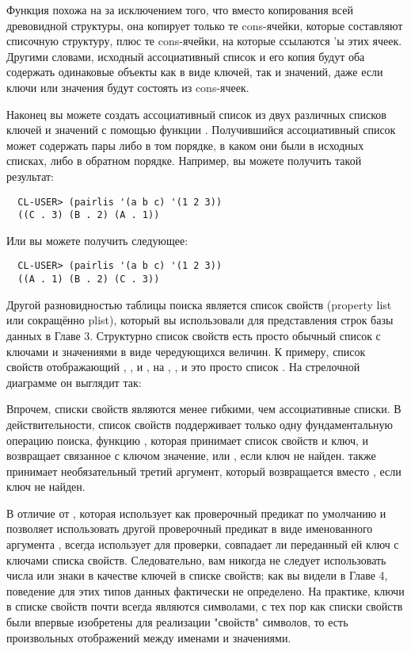 Функция  похожа на  за исключением того, что вместо
копирования всей древовидной структуры, она копирует только те cons-ячейки, которые
составляют списочную структуру, плюс те cons-ячейки, на которые ссылаются 'ы
этих ячеек. Другими словами, исходный ассоциативный список и его копия будут оба содержать
одинаковые объекты как в виде ключей, так и значений, даже если ключи или значения будут
состоять из cons-ячеек.

Наконец вы можете создать ассоциативный список из двух различных списков ключей и значений
с помощью функции . Получившийся ассоциативный список может содержать пары
либо в том порядке, в каком они были в исходных списках, либо в обратном
порядке. Например, вы можете получить такой результат:

\begin{verbatim}
  CL-USER> (pairlis '(a b c) '(1 2 3))
  ((C . 3) (B . 2) (A . 1))
\end{verbatim}

Или вы можете получить следующее:

\begin{verbatim}
  CL-USER> (pairlis '(a b c) '(1 2 3))
  ((A . 1) (B . 2) (C . 3))
\end{verbatim}

Другой разновидностью таблицы поиска является список свойств (property list или сокращённо
plist), который вы использовали для представления строк базы данных в Главе 3. Структурно
список свойств есть просто обычный список с ключами и значениями в виде чередующихся
величин. К примеру, список свойств отображающий , , и , на
, , и  это просто список . На стрелочной
диаграмме он выглядит так:


Впрочем, списки свойств являются менее гибкими, чем ассоциативные списки. В
действительности, список свойств поддерживает только одну фундаментальную операцию поиска,
функцию , которая принимает список свойств и ключ, и возвращает связанное с
ключом значение, или , если ключ не найден.  также принимает
необязательный третий аргумент, который возвращается вместо , если ключ не
найден.

В отличие от , которая использует  как проверочный предикат по
умолчанию и позволяет использовать другой проверочный предикат в виде именованного
аргумента ,  всегда использует  для проверки, совпадает ли
переданный ей ключ с ключами списка свойств. Следовательно, вам никогда не следует
использовать числа или знаки в качестве ключей в списке свойств; как вы видели в Главе 4,
поведение  для этих типов данных фактически не определено. На практике, ключи в
списке свойств почти всегда являются символами, с тех пор как списки свойств были впервые
изобретены для реализации "свойств" символов, то есть произвольных отображений между
именами и значениями.

